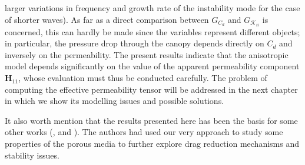 larger variations in frequency and growth rate of the instability mode for the case of shorter waves).
As far as a direct comparison between $G_{C_d}$ and $G_{\mathcal{K}_{ii}}$ is concerned, this can hardly be made since
the variables represent different objects; in particular, the pressure drop through the canopy depends
directly on $C_d$ and inversely on the permeability. The present results indicate that the anisotropic
model depends significantly on the value of the apparent \citet{zampogna2016fluid} permeability component $\mathbf{H}_{11}$, whose
evaluation must thus be conducted carefully. The problem of computing the effective permeability tensor will be addressed in the next chapter in which we show its modelling issues and possible solutions.

It also worth mention that the results presented here has been the basis for some other works (\citet{segura2017permeable}, \citet{sharma2017stabilitycanopy} and \citet{garcia2017analysis}). The authors had used our very approach to study some properties of the porous media to further explore drag reduction mechanisms and stability issues.






